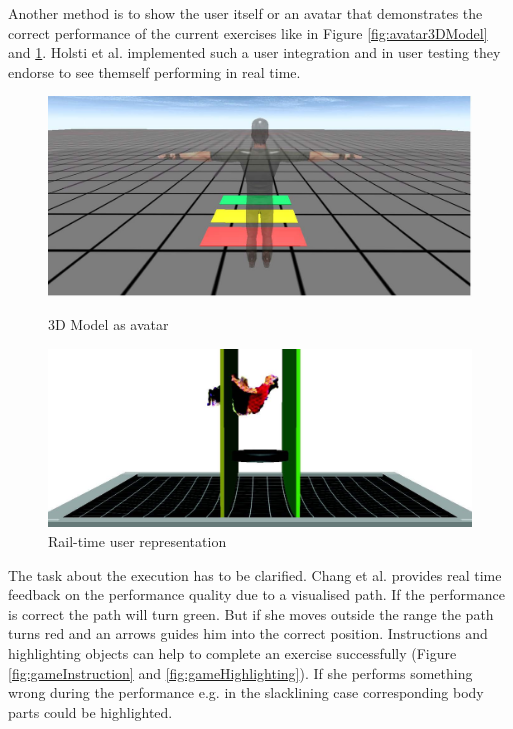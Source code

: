 Another method is to show the user itself or an avatar that demonstrates the correct performance of the current exercises like in Figure \ref{fig:avatar3DModel} and \ref{fig:avatarUser}. Holsti et al. \cite{Holsti2013-kn} implemented such a user integration and in user testing they endorse to see themself performing in real time.

\begin{figure}[htb]
	\centering
	\begin{minipage}[t]{0.49\linewidth}
		\centering
		\includegraphics[width=1\linewidth]{Pictures/avatar3DModel}
		\caption{3D Model as avatar \cite{Estepa2016-oj}}
		\label{fig:avatar3DModel}
	\end{minipage}
	\hfill
	\begin{minipage}[t]{0.49\linewidth}
		\centering
		\includegraphics[width=1\linewidth]{Pictures/avatarUser}
		\caption{Rail-time user representation \cite{Holsti2013-kn}}
		\label{fig:avatarUser}
	\end{minipage}
\end{figure}

The task about the execution has to be clarified. Chang et al. \cite{Chang2012-hz} provides real time feedback on the performance quality due to a visualised path. If the performance is correct the path will turn green. But if she moves outside the range the path turns red and an arrows guides him into the correct position. Instructions and highlighting objects can help to complete an exercise successfully (Figure \ref{fig:gameInstruction} and \ref{fig:gameHighlighting}). If she performs something wrong during the performance e.g. in the slacklining case corresponding body parts could be highlighted.

